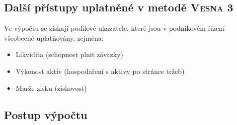\documentclass [10pt, fancyhdr, twoside] {article}
\begin{document}
\subsection{Další přístupy uplatněné v metodě \textsc{Vesna} 3}

Ve výpočtu se získají podílové ukazatele, které jsou v podnikovém řízení všeobecně uplatňovány, zejména:

\begin{itemize}
\item Likvidita (schopnost plnit závazky)
\item Výkonost aktiv (hospodaření s aktivy po stránce tržeb)
\item Marže zisku (ziskovost)
\end{itemize}

\subsection{Postup výpočtu}
\end{document}
